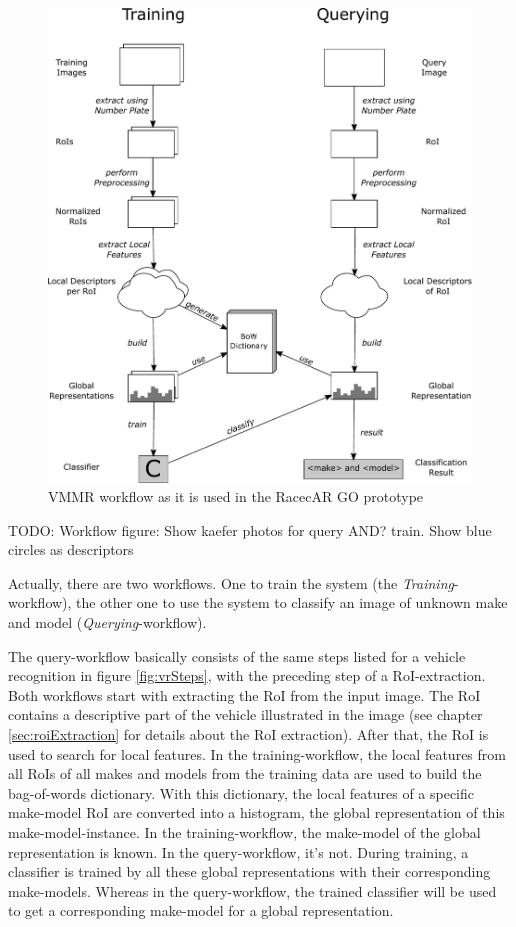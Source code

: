\begin{figure}[btph]
  \centering
        \includegraphics[width=.75\linewidth]{gfx/vmmr_workflow}
        \caption{VMMR workflow as it is used in the RacecAR GO prototype}
        \label{fig:vmmrWorkflow}
\end{figure}
TODO: Workflow figure: Show kaefer photos for query AND? train. Show blue circles as descriptors

Actually, there are two workflows. One to train the system (the \emph{Training}-workflow), the other one to use the system to classify an image of unknown make and model (\emph{Querying}-workflow).

The query-workflow basically consists of the same steps listed for a vehicle recognition in figure \ref{fig:vrSteps}, with the preceding step of a RoI-extraction. Both workflows start with extracting the RoI from the input image. The RoI contains a descriptive part of the vehicle illustrated in the image (see chapter \ref{sec:roiExtraction} for details about the RoI extraction). After that, the RoI is used to search for local features. In the training-workflow, the local features from all RoIs of all makes and models from the training data are used to build the bag-of-words dictionary. With this dictionary, the local features of a specific make-model RoI are converted into a histogram, the global representation of this make-model-instance. In the training-workflow, the make-model of the global representation is known. In the query-workflow, it's not.
During training, a classifier is trained by all these global representations with their corresponding make-models. Whereas in the query-workflow, the trained classifier will be used to get a corresponding make-model for a global representation.

